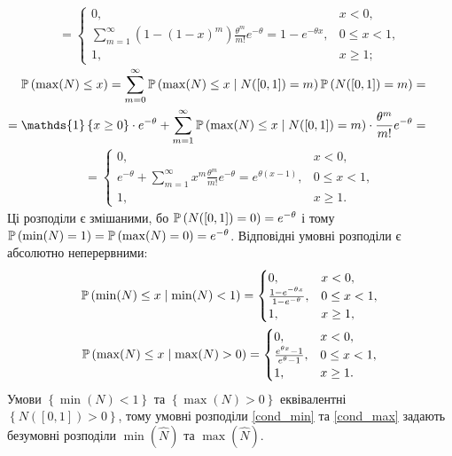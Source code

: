 \begin{gather}
    = \begin{cases}
        0, & x < 0, \\
        \sum_{m=1}^{\infty} \left(1 - (1 - x)^m\right) \frac{\theta^m}{m!} e^{-\theta} = 1 - e^{-\theta x}, & 0 \leq x < 1, \\
        1, & x \geq 1;
    \end{cases}
\end{gather}
$\begin{aligned}
    \P{\max(N) \leq x} = \sum_{m=0}^{\infty} \P{\max(N) \leq x \mid N([0, 1]) = m} \P{N([0, 1]) = m} = \\
     = \mathds{1}\left\{x\geq 0\right\}\cdot e^{-\theta} +
    \sum_{m=1}^{\infty} \P{\max(N) \leq x \mid N([0, 1]) = m} \cdot \frac{\theta^m}{m!} e^{-\theta} = \\
\end{aligned}$
\vspace{-10pt}
\begin{gather} 
    = \begin{cases}
        0, & x < 0, \\
        e^{-\theta} + \sum_{m=1}^{\infty} x^m \frac{\theta^m}{m!} e^{-\theta} = e^{\theta(x-1)}, & 0 \leq x < 1, \\
        1, & x \geq 1.
    \end{cases}
\end{gather}
Ці розподіли є змішаними, бо $\P{N([0, 1]) = 0} = e^{-\theta}$ і тому
$\P{\min(N) = 1} = \P{\max(N) = 0} = e^{-\theta}$. 
Відповідні умовні розподіли є абсолютно неперервними:
\begin{gather}\label{cond_min}
    \P{\min(N) \leq x \mid \min(N) < 1} = 
    \begin{cases}
        0, & x < 0, \\
        \frac{1-e^{-\theta x}}{1-e^{-\theta}}, & 0 \leq x < 1, \\
        1, & x \geq 1,
    \end{cases} \\
\label{cond_max}
    \P{\max(N) \leq x \mid \max(N) > 0} = 
    \begin{cases}
        0, & x < 0, \\
        \frac{e^{\theta x} - 1}{e^{\theta} - 1}, & 0 \leq x < 1, \\
        1, & x \geq 1.
    \end{cases}
\end{gather}
Умови $\left\{ \min(N) < 1\right\}$ та $\left\{ \max(N) > 0\right\}$
еквівалентні $\left\{N([0, 1]) > 0 \right\}$, тому 
умовні розподіли \eqref{cond_min} та \eqref{cond_max} 
задають безумовні розподіли $\min(\widehat{N})$ та $\max(\widehat{N})$.

